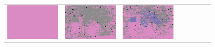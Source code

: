 \documentclass{ipol}
\begin{document}
\begin{figure}[ht]
\begin{tabular}{cccccccc}
                \includegraphics[width=\s]{images/bike/LINEAR/iso_64_grids.png} &
                \includegraphics[width=\s]{images/bike/PPG/iso_64_grids.png} &
                \includegraphics[width=\s]{images/bike/VNG/iso_64_grids.png} \\

\end{tabular}
\end{figure}
\end{document}
